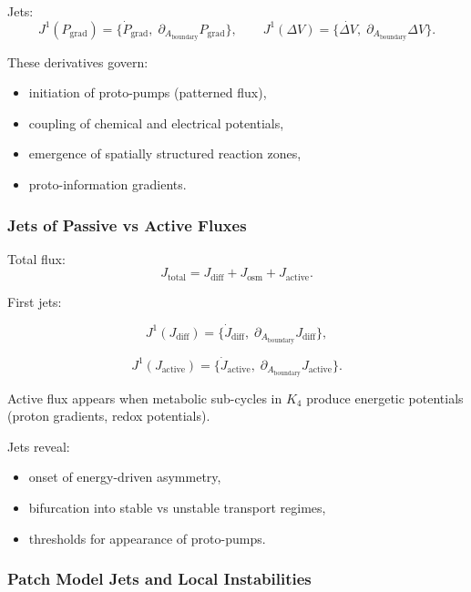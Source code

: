 Jets:
\[
J^1(P_{\mathrm{grad}})=
\{\dot{P}_{\mathrm{grad}},\;\partial_{A_{\mathrm{boundary}}}P_{\mathrm{grad}}\},
\qquad
J^1(\Delta V)=
\{\dot{\Delta V},\;\partial_{A_{\mathrm{boundary}}}\Delta V\}.
\]

These derivatives govern:

\begin{itemize}
    \item initiation of proto-pumps (patterned flux),
    \item coupling of chemical and electrical potentials,
    \item emergence of spatially structured reaction zones,
    \item proto-information gradients.
\end{itemize}


\subsubsection{Jets of Passive vs Active Fluxes}

Total flux:
\[
J_{\mathrm{total}}
=
J_{\mathrm{diff}} + J_{\mathrm{osm}} + J_{\mathrm{active}}.
\]

First jets:

\[
J^1(J_{\mathrm{diff}})=
\{\dot{J}_{\mathrm{diff}},\;\partial_{A_{\mathrm{boundary}}}J_{\mathrm{diff}}\},
\]

\[
J^1(J_{\mathrm{active}})=
\{\dot{J}_{\mathrm{active}},\;\partial_{A_{\mathrm{boundary}}}J_{\mathrm{active}}\}.
\]

Active flux appears when metabolic sub-cycles in $K_4$ produce energetic
potentials (proton gradients, redox potentials).

Jets reveal:

\begin{itemize}
    \item onset of energy-driven asymmetry,
    \item bifurcation into stable vs unstable transport regimes,
    \item thresholds for appearance of proto-pumps.
\end{itemize}


\subsubsection{Patch Model Jets and Local Instabilities}


